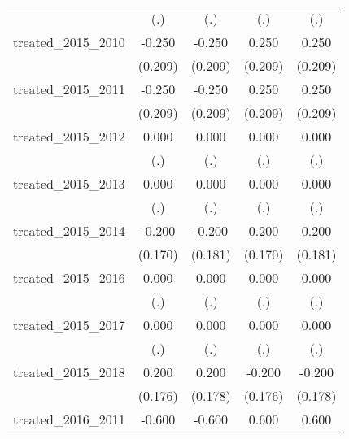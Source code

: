 {\begin{tabular}{l*{4}{c}}
            &         (.)         &         (.)         &         (.)         &         (.)         \\
[1em]
treated\_2015\_2010&      -0.250         &      -0.250         &       0.250         &       0.250         \\
            &     (0.209)         &     (0.209)         &     (0.209)         &     (0.209)         \\
[1em]
treated\_2015\_2011&      -0.250         &      -0.250         &       0.250         &       0.250         \\
            &     (0.209)         &     (0.209)         &     (0.209)         &     (0.209)         \\
[1em]
treated\_2015\_2012&       0.000         &       0.000         &       0.000         &       0.000         \\
            &         (.)         &         (.)         &         (.)         &         (.)         \\
[1em]
treated\_2015\_2013&       0.000         &       0.000         &       0.000         &       0.000         \\
            &         (.)         &         (.)         &         (.)         &         (.)         \\
[1em]
treated\_2015\_2014&      -0.200         &      -0.200         &       0.200         &       0.200         \\
            &     (0.170)         &     (0.181)         &     (0.170)         &     (0.181)         \\
[1em]
treated\_2015\_2016&       0.000         &       0.000         &       0.000         &       0.000         \\
            &         (.)         &         (.)         &         (.)         &         (.)         \\
[1em]
treated\_2015\_2017&       0.000         &       0.000         &       0.000         &       0.000         \\
            &         (.)         &         (.)         &         (.)         &         (.)         \\
[1em]
treated\_2015\_2018&       0.200         &       0.200         &      -0.200         &      -0.200         \\
            &     (0.176)         &     (0.178)         &     (0.176)         &     (0.178)         \\
[1em]
treated\_2016\_2011&      -0.600\sym{**} &      -0.600\sym{**} &       0.600\sym{**} &       0.600\sym{**} \\

\end{tabular}}
